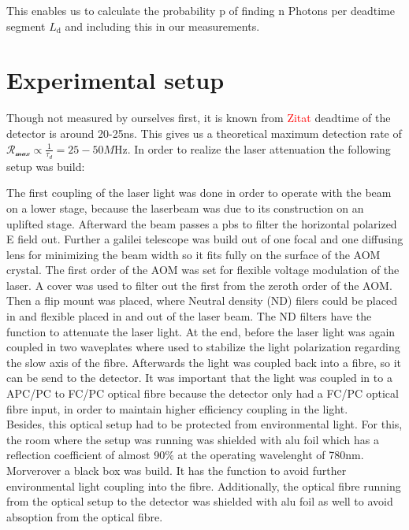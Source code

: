 This enables us to calculate the probability p of finding n Photons per deadtime segment $L_{\text{d}}$ and
including this in our measurements.

\section{Experimental setup}

Though not measured by ourselves first, it is known from \textcolor{red}{Zitat} deadtime of the detector is around 20-25ns.
This gives us a theoretical maximum detection rate of $\mathcal{R_{\max}} \propto \frac{1}{\tau_{d}} = 25-50\si{M\Hz}$.
In order to realize the laser attenuation the following setup was build:

The first coupling of the laser light was done in order to operate with the beam on a lower stage, because the laserbeam 
was due to its construction on an uplifted stage. 
Afterward the beam passes a pbs to filter the horizontal polarized E field out. 
Further a galilei telescope was build out of one focal and one diffusing lens for minimizing the beam width so it fits fully
on the surface of the AOM crystal. The first order of the AOM was set for flexible voltage modulation of the laser.
A cover was used to filter out the first from the zeroth order of the AOM. Then a flip mount was placed, where 
Neutral density (ND) filers could be placed in and flexible placed in and out of the laser beam. 
The ND filters have the function to attenuate the laser light. 
At the end, before the laser light was again coupled in two waveplates where used to stabilize the light polarization regarding the
slow axis of the fibre. Afterwards the light was coupled back into a fibre, so it can be send to the detector.
It was important that the light was coupled in to a APC/PC to FC/PC optical fibre because the detector only had a FC/PC optical fibre
input, in order to maintain higher efficiency coupling in the light.\\

Besides, this optical setup had to be protected from environmental light. For this, the room where the setup was running was shielded 
with alu foil which has a reflection coefficient of almost 90$\%$ at the operating wavelenght of 780nm. 
Morverover a black box was build. It has the function to avoid further environmental light coupling into the fibre. Additionally, 
the optical fibre running from the optical setup to the detector was shielded with alu foil as well to avoid absoption from the optical 
fibre. \\

